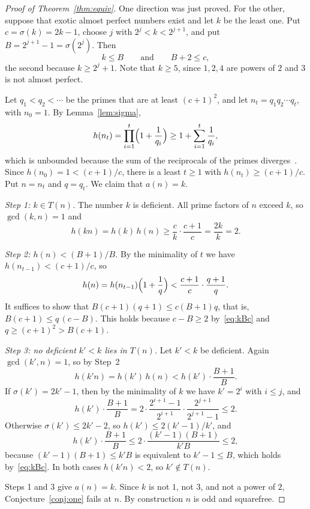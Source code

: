 \documentclass[12pt,reqno]{article}
\theoremstyle{plain}
\theoremstyle{definition}
\theoremstyle{remark}
\begin{document}
\begin{proof}[Proof of Theorem~\ref{thm:equiv}]
One direction was just proved. For the other, suppose that exotic almost perfect
numbers exist and let $k$ be the least one. Put $c = \sigma(k) = 2k-1$, choose
$j$ with $2^j < k < 2^{j+1}$, and put $B = 2^{j+1}-1 = \sigma(2^j)$. Then
\begin{equation}\label{eq:kBc}
  k \le B \qquad\text{and}\qquad B + 2 \le c ,
\end{equation}
the second because $k \ge 2^j+1$. Note that $k \ge 5$, since $1, 2, 4$ are
powers of $2$ and $3$ is not almost perfect.

Let $q_1 < q_2 < \cdots$ be the primes that are at least $(c+1)^2$, and let
$n_t = q_1 q_2 \cdots q_t$, with $n_0 = 1$. By Lemma~\ref{lem:sigma},
\[
  h(n_t) = \prod_{i=1}^{t} \Bigl(1 + \frac{1}{q_i}\Bigr) \ge 1 + \sum_{i=1}^{t} \frac{1}{q_i},
\]
which is unbounded because the sum of the reciprocals of the primes
diverges~\cite[Theorem 19]{hw}. Since $h(n_0) = 1 < (c+1)/c$, there is a least
$t \ge 1$ with $h(n_t) \ge (c+1)/c$. Put $n = n_t$ and $q = q_t$. We claim that
$a(n) = k$.

\emph{Step 1: $k \in T(n)$.} The number $k$ is deficient. All prime factors of
$n$ exceed $k$, so $\gcd(k,n) = 1$ and
\[
  h(kn) = h(k)\,h(n) \ge \frac{c}{k}\cdot\frac{c+1}{c} = \frac{2k}{k} = 2 .
\]

\emph{Step 2: $h(n) < (B+1)/B$.} By the minimality of $t$ we have
$h(n_{t-1}) < (c+1)/c$, so
\[
  h(n) = h(n_{t-1})\Bigl(1 + \frac1q\Bigr) < \frac{c+1}{c}\cdot\frac{q+1}{q} .
\]
It suffices to show that $B(c+1)(q+1) \le c(B+1)q$, that is,
$B(c+1) \le q\,(c - B)$. This holds because $c - B \ge 2$ by~\eqref{eq:kBc} and
$q \ge (c+1)^2 > B(c+1)$.

\emph{Step 3: no deficient $k' < k$ lies in $T(n)$.} Let $k' < k$ be deficient.
Again $\gcd(k',n) = 1$, so by Step~2
\[
  h(k'n) = h(k')\,h(n) < h(k')\cdot\frac{B+1}{B}.
\]
If $\sigma(k') = 2k'-1$, then by the minimality of $k$ we have $k' = 2^i$ with
$i \le j$, and
\[
  h(k')\cdot\frac{B+1}{B} = 2\cdot\frac{2^{i+1}-1}{2^{i+1}}\cdot\frac{2^{j+1}}{2^{j+1}-1} \le 2 .
\]
Otherwise $\sigma(k') \le 2k'-2$, so $h(k') \le 2(k'-1)/k'$, and
\[
  h(k')\cdot\frac{B+1}{B} \le 2\cdot\frac{(k'-1)(B+1)}{k'B} \le 2,
\]
because $(k'-1)(B+1) \le k'B$ is equivalent to $k'-1 \le B$, which holds
by~\eqref{eq:kBc}. In both cases $h(k'n) < 2$, so $k' \notin T(n)$.

Steps 1 and 3 give $a(n) = k$. Since $k$ is not $1$, not $3$, and not a power of
$2$, Conjecture~\ref{conj:one} fails at $n$. By construction $n$ is odd and
squarefree.
\end{proof}
\end{document}
